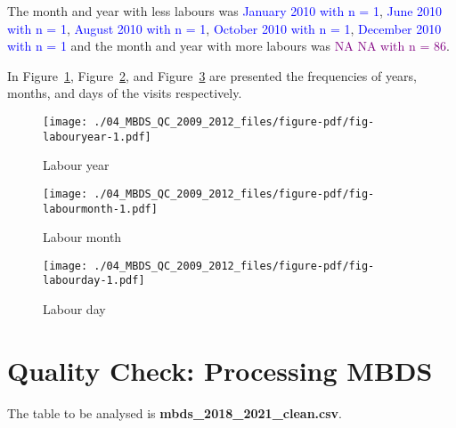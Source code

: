 \documentclass[
  letterpaper,
  DIV=11,
  numbers=noendperiod]{scrreprt}
\begin{document}
The month and year with less labours was
\textcolor{blue}{January 2010 with n = 1},
\textcolor{blue}{June 2010 with n = 1},
\textcolor{blue}{August 2010 with n = 1},
\textcolor{blue}{October 2010 with n = 1},
\textcolor{blue}{December 2010 with n = 1} and the month and year with
more labours was \textcolor{purple}{NA NA with n = 86}.

In Figure~\ref{fig-labouryear}, Figure~\ref{fig-labourmonth}, and
Figure~\ref{fig-labourday} are presented the frequencies of years,
months, and days of the visits respectively.

\begin{figure}

{\centering \texttt{[image: ./04\_MBDS\_QC\_2009\_2012\_files/figure-pdf/fig-labouryear-1.pdf]}

}

\caption{\label{fig-labouryear}Labour year}

\end{figure}

\begin{figure}

{\centering \texttt{[image: ./04\_MBDS\_QC\_2009\_2012\_files/figure-pdf/fig-labourmonth-1.pdf]}

}

\caption{\label{fig-labourmonth}Labour month}

\end{figure}

\begin{figure}

{\centering \texttt{[image: ./04\_MBDS\_QC\_2009\_2012\_files/figure-pdf/fig-labourday-1.pdf]}

}

\caption{\label{fig-labourday}Labour day}

\end{figure}


\hypertarget{quality-check-processing-mbds-1}{%
\chapter{Quality Check: Processing
MBDS}\label{quality-check-processing-mbds-1}}

The table to be analysed is \textbf{mbds\_2018\_2021\_clean.csv}.

\end{document}
